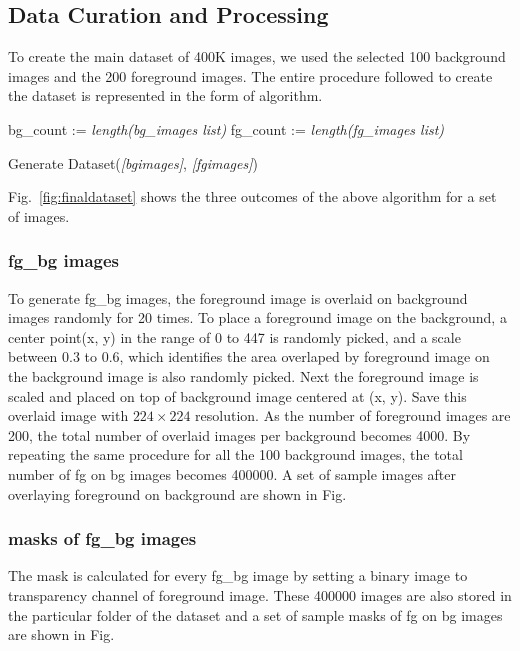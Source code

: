 \documentclass[review]{cvpr}
\begin{document}
\subsection{Data Curation and Processing}
To create the main dataset of 400K images, we used the selected 100 background images and the 200 foreground images. 
The entire procedure followed to create the dataset is represented in the form of algorithm. 

\IncMargin{1em}
\begin{algorithm}
\SetAlgoLined
{} 
bg\_count := \textit{length(bg\_images list)} \;
fg\_count := \textit{length(fg\_images list)} \;
\caption{Generate Dataset(\textit{[bgimages]}, \textit{[fgimages]})}
\end{algorithm}

Fig.~\ref{fig:finaldataset} shows the three outcomes of the above algorithm for a set of images.

\subsubsection{fg\_bg images}
To generate fg\_bg images, the foreground image is overlaid on background images randomly for 20 times. 
To place a foreground image on the background, a center point(x, y) in the range of 0 to 447 is randomly picked,
 and a scale between 0.3 to 0.6, which identifies the area overlaped by foreground image on the background image is also randomly picked. 
 Next the foreground image is scaled and placed on top of background image centered at (x, y). 
 Save this overlaid image with $224 \times 224$ resolution.   
 As the number of foreground images are 200, the total number of overlaid images per background becomes 4000. 
 By repeating the same procedure for all the 100 background images, the total number of fg on bg images becomes 400000. 
 A set of sample images after overlaying foreground on background are shown in Fig. 

\subsubsection{masks of fg\_bg images}
The mask is calculated for every fg\_bg image by setting a binary image to transparency channel of foreground image. 
These 400000 images are also stored in the particular folder of the dataset and a set of sample masks of fg on bg images are shown in Fig.  
\end{document}
